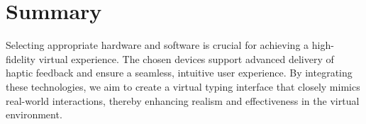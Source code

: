 \section{Summary}
\label{sec:Summary}

Selecting appropriate hardware and software is crucial for achieving a high-fidelity virtual experience. The chosen devices support advanced delivery of haptic feedback and ensure a seamless, intuitive user experience. By integrating these technologies, we aim to create a virtual typing interface that closely mimics real-world interactions, thereby enhancing realism and effectiveness in the virtual environment.
